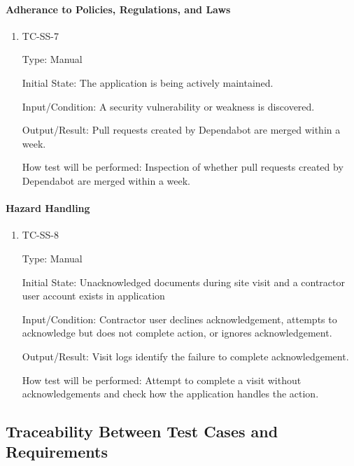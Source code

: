 \documentclass[12pt, titlepage]{article}
\begin{document}
\paragraph{Adherance to Policies, Regulations, and Laws}

\begin{enumerate}

  \item{TC-SS-7\\}

    Type: Manual

    Initial State: The application is being actively maintained.

    Input/Condition: A security vulnerability or weakness is discovered.

    Output/Result: Pull requests created by Dependabot are merged within a week.

    How test will be performed: Inspection of whether pull requests created by Dependabot are merged within a week.

\end{enumerate}

\paragraph{Hazard Handling}

\begin{enumerate}

  \item{TC-SS-8\\}

    Type: Manual

    Initial State: Unacknowledged documents during site visit and a contractor user account
    exists in application

    Input/Condition: Contractor user declines acknowledgement, attempts to
    acknowledge but does not complete action, or ignores acknowledgement.

    Output/Result: Visit logs identify the failure to complete acknowledgement.

    How test will be performed: Attempt to complete a visit without acknowledgements
    and check how the application handles the action.

\end{enumerate}

\subsection{Traceability Between Test Cases and Requirements}
\end{document}
